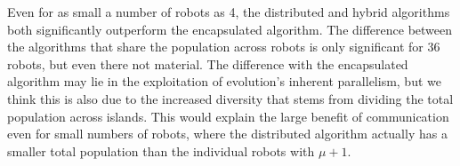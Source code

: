 \documentclass[runningheads]{llncs}
\begin{document}
\begin{table}[t!]
\centering
{}
\caption{Parameters obtained with Bonesa for the encapsulated,
  distributed and hybrid algorithms.}
\label{tab:results_distributed}
\end{table}


Even for as small a number of robots as 4, the distributed and hybrid algorithms both significantly outperform the encapsulated algorithm. The difference between the algorithms that share the population across robots is only significant for 36 robots, but even there not material. The difference with the encapsulated algorithm may lie in the exploitation of evolution's inherent parallelism, but we think this is also due to the increased diversity that stems from dividing the total population across islands. This would explain the large benefit of communication even for small numbers of robots, where the distributed algorithm actually has a smaller total population than the individual robots with $\mu+1$.
\end{document}
